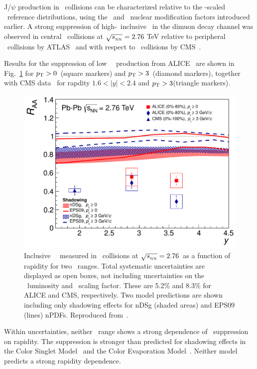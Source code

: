 J/$\psi$ production in \PbPb\ collisions can be characterized relative to the \Ncoll-scaled \pp\ reference
distributions, using the \Rcp\ and \Raa\ nuclear modification factors introduced earlier.
A strong suppression of high-\pT\ inclusive \jpsi\ in the dimuon decay channel was observed in central \PbPb\ collisions
at $\sqrt{s_{_{\rm NN}}} = 2.76$ TeV  relative to peripheral \PbPb\ collisions by ATLAS~\cite{Aad:2010aa}
and with respect to \pp\ collisions by CMS~\cite{Chatrchyan:2012np}.

Results for the suppression of low \pT\ \jpsi\ production from ALICE~\cite{Abelev:2012rv} are shown
in Fig.~\ref{fig:GR:raavsy} for $\mbox{$p_{\mathrm{T}}$} > 0$\GeVc\ (square markers) and
$\mbox{$p_{\mathrm{T}}$} > 3$\GeVc\ (diamond markers), together with CMS data~\cite{Chatrchyan:2012np}
for rapdity $ 1.6 < |y| < 2.4 $ and $\mbox{$p_{\mathrm{T}}$} > 3$\GeVc (triangle markers).

\begin{figure}
\begin{center}
\includegraphics[width=0.49\linewidth]{qqbarfigures/RAAvsY_v7-eps-converted-to.pdf}
\caption{ \label{fig:GR:raavsy}  Inclusive \jpsi\ \Raa\ measured in \PbPb\
collisions at $\sqrt{s_{_{\rm NN}}} = 2.76$\TeV\ as a function of  rapidity for two \pT\ ranges.
Total systematic uncertainties are displayed as open boxes, not including
uncertainties on the \pp\ luminosity and \Taa\ scaling factor.  These are
5.2\% and  8.3\% for ALICE and CMS, respectively.
Two model predictions are shown~\cite{Ferreiro:2011rw,Vogt:2010aa} including only shadowing effects
for  nDSg (shaded areas) and EPS09 (lines) nPDFs. Reproduced from~\cite{Abelev:2012rv}.}
\end{center}
\end{figure}

Within uncertainties, neither \pT\ range shows a strong dependence of \jpsi\ suppression on rapidity.
The suppression is stronger than predicted for shadowing effects in the Color Singlet
Model~\cite{Ferreiro:2011rw} and the Color Evaporation Model~\cite{Vogt:2010aa}. Neither model
predicts a strong rapidity dependence.

